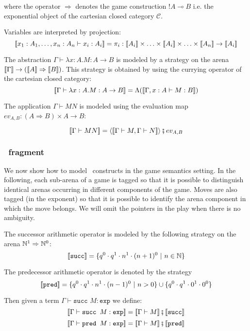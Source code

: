 where the operator $\Rightarrow$ denotes the game construction $!A
\multimap B$ i.e. the exponential object of the cartesian closed
category $\mathcal{C}$.



Variables are interpreted by projection:
$$\sem{x_1 : A_1, \ldots, x_n:A_n \vdash x_i : A_i} = \pi_i : \sem{A_i} \times \ldots \times \sem{A_i} \times \ldots \times \sem{A_n} \rightarrow  \sem{A_i}$$

The abstraction $\Gamma \vdash \lambda x :A.M : A \rightarrow B$ is
modeled by a strategy on the arena ${[\![ \Gamma ]\!]} \rightarrow
({[\![ A ]\!]}\Rightarrow{[\![B ]\!]})$. This strategy is obtained by using the
currying operator of the cartesian closed category:
$${[\![ \Gamma \vdash \lambda x :A.M : A \rightarrow B ]\!]} = \Lambda( {[\![ \Gamma, x :A \vdash M : B ]\!]})$$

The application $\Gamma \vdash M N$ is modeled using the evaluation
map $ev_{A,B} : (A\Rightarrow B)\times A \rightarrow B$:

$${[\![ \Gamma \vdash M N ]\!]} = \langle {[\![\Gamma \vdash M, \Gamma \vdash N ]\!]} \rangle \fatsemi ev_{A,B}$$


\subsubsection{\pcf\ fragment}

We now show how to model \pcf\ constructs in the game semantics
setting. In the following, each sub-arena of a game is tagged so that it is possible to distinguish identical arenas
occurring in different components of the game. Moves are also tagged (in the exponent) so that it is possible
to identify the arena component in which the move belongs. We will
omit the pointers in the play when there is no ambiguity.

The successor arithmetic operator is modeled by the following
strategy on the arena $\mathbb{N}^1 \Rightarrow \mathbb{N}^0$:
$${[\![ \texttt{succ} ]\!]} = \{q^0 \cdot q^1 \cdot n^1 \cdot (n+1)^0\ |\ n \in \mathbb{N} \}$$

The predecessor arithmetic operator is denoted by the strategy
$${[\![ \texttt{pred} ]\!]} = \{q^0 \cdot q^1 \cdot n^1 \cdot (n-1)^0\ |\ n >0 \} \cup \{ q^0 \cdot q^1 \cdot 0^1 \cdot 0^0 \} $$

Then given a term $\Gamma \vdash \texttt{succ }M : \texttt{exp}$ we
define:
$${[\![ \Gamma \vdash \texttt{succ } M : \texttt{exp} ]\!]} = {[\![ \Gamma \vdash M ]\!]} \fatsemi {[\![\texttt{succ} ]\!]} $$
$${[\![ \Gamma \vdash \texttt{pred } M : \texttt{exp} ]\!]} = {[\![ \Gamma \vdash M ]\!]} \fatsemi {[\![\texttt{pred} ]\!]} $$


